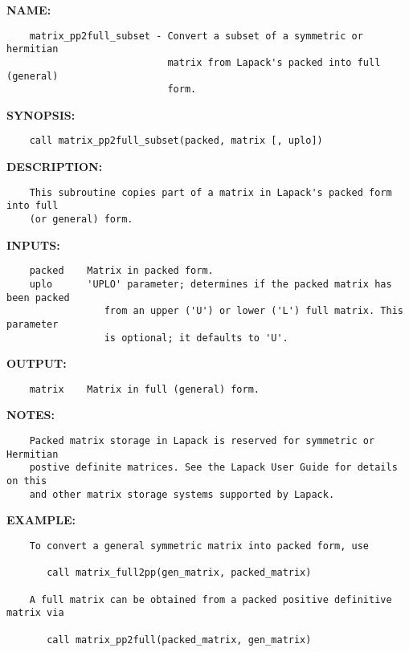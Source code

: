 \label{ch:robo24}
\label{ch:Matrices_matrix_pp2full_subset}
\textbf{NAME:}\hspace{0.08in}\begin{Verbatim}
    matrix_pp2full_subset - Convert a subset of a symmetric or hermitian 
                            matrix from Lapack's packed into full (general) 
                            form.
\end{Verbatim}
\textbf{SYNOPSIS:}\hspace{0.08in}\begin{Verbatim}
    call matrix_pp2full_subset(packed, matrix [, uplo])
\end{Verbatim}
\textbf{DESCRIPTION:}\hspace{0.08in}\begin{Verbatim}
    This subroutine copies part of a matrix in Lapack's packed form into full 
    (or general) form.
\end{Verbatim}
\textbf{INPUTS:}\hspace{0.08in}\begin{Verbatim}
    packed    Matrix in packed form.
    uplo      'UPLO' parameter; determines if the packed matrix has been packed
                 from an upper ('U') or lower ('L') full matrix. This parameter
                 is optional; it defaults to 'U'.
\end{Verbatim}
\textbf{OUTPUT:}\hspace{0.08in}\begin{Verbatim}
    matrix    Matrix in full (general) form.
\end{Verbatim}
\textbf{NOTES:}\hspace{0.08in}\begin{Verbatim}
    Packed matrix storage in Lapack is reserved for symmetric or Hermitian
    postive definite matrices. See the Lapack User Guide for details on this
    and other matrix storage systems supported by Lapack. 
\end{Verbatim}
\textbf{EXAMPLE:}\hspace{0.08in}\begin{Verbatim}
    To convert a general symmetric matrix into packed form, use

       call matrix_full2pp(gen_matrix, packed_matrix)

    A full matrix can be obtained from a packed positive definitive matrix via

       call matrix_pp2full(packed_matrix, gen_matrix)
\end{Verbatim}
